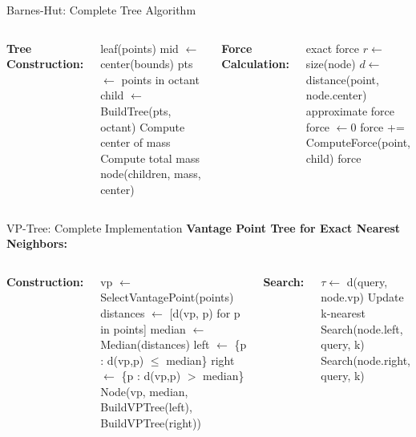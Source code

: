 \begin{frame}{Barnes-Hut: Complete Tree Algorithm}
\begin{columns}
\textbf{Tree Construction:}
\begin{algorithmic}[1]
\small
{}
    \State \Return leaf(points)
\EndIf
\State mid $\leftarrow$ center(bounds)
    \State pts $\leftarrow$ points in octant
    \State child $\leftarrow$ BuildTree(pts, octant)
\EndFor
\State Compute center of mass
\State Compute total mass
\State \Return node(children, mass, center)
\EndFunction
\end{algorithmic}

\textbf{Force Calculation:}
\begin{algorithmic}[1]
\small
{}
    \State \Return exact force
\EndIf
\State $r \leftarrow$ size(node)
\State $d \leftarrow$ distance(point, node.center)
    \State \Return approximate force
\Else
    \State force $\leftarrow 0$
        \State force += ComputeForce(point, child)
    \EndFor
    \State \Return force
\EndIf
\EndFunction
\end{algorithmic}
\end{columns}
\end{frame}

\begin{frame}{VP-Tree: Complete Implementation}
\textbf{Vantage Point Tree for Exact Nearest Neighbors:}

\begin{columns}
\textbf{Construction:}
\begin{algorithmic}[1]
\small
{}
\State vp $\leftarrow$ SelectVantagePoint(points)
\State distances $\leftarrow$ [d(vp, p) for p in points]
\State median $\leftarrow$ Median(distances)
\State left $\leftarrow$ \{p : d(vp,p) $\leq$ median\}
\State right $\leftarrow$ \{p : d(vp,p) $>$ median\}
\State \Return Node(vp, median, 
    BuildVPTree(left),
    BuildVPTree(right))
\EndFunction
\end{algorithmic}

\textbf{Search:}
\begin{algorithmic}[1]
\small
{}
\State $\tau \leftarrow$ d(query, node.vp)
    \State Update k-nearest
\EndIf
{}
    \State Search(node.left, query, k)
\EndIf
{}
    \State Search(node.right, query, k)
\EndIf
\EndFunction
\end{algorithmic}
\end{columns}

\end{frame}

